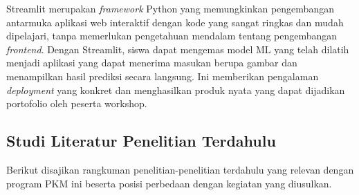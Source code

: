 Streamlit merupakan \textit{framework} Python yang memungkinkan pengembangan antarmuka aplikasi web interaktif dengan kode yang sangat ringkas dan mudah dipelajari, tanpa memerlukan pengetahuan mendalam tentang pengembangan \textit{frontend}. Dengan Streamlit, siswa dapat mengemas model ML yang telah dilatih menjadi aplikasi yang dapat menerima masukan berupa gambar dan menampilkan hasil prediksi secara langsung. Ini memberikan pengalaman \textit{deployment} yang konkret dan menghasilkan produk nyata yang dapat dijadikan portofolio oleh peserta workshop.

\subsection{Studi Literatur Penelitian Terdahulu}
Berikut disajikan rangkuman penelitian-penelitian terdahulu yang relevan dengan program PKM ini beserta posisi perbedaan dengan kegiatan yang diusulkan.

